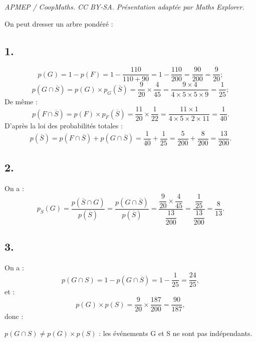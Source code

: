 \documentclass[10pt]{article}
\begin{document}
\noindent\textit{APMEP / CoopMaths. CC BY-SA. Présentation adaptée par Maths Explorer.}\par\medskip
On peut dresser un arbre pondéré :
\begin{center}
\end{center}

\subsection*{1.}

\[
p(G) = 1 - p(F) = 1 - \dfrac{110}{110 + 90} = 1 - \dfrac{110}{200} = \dfrac{90}{200} = \dfrac{9}{20};
\]
\[
p(G \cap \overline{S}) = p(G) \times p_G(\overline{S}) = \dfrac{9}{20} \times \dfrac{4}{45} = \dfrac{9 \times 4}{4 \times 5 \times 5 \times 9} = \dfrac{1}{25};
\]
De même :
\[
p(F \cap \overline{S}) = p(F) \times p_F(\overline{S}) = \dfrac{11}{20} \times \dfrac{1}{22} = \dfrac{11 \times 1}{4 \times 5 \times 2 \times 11} = \dfrac{1}{40}.
\]
D'après la loi des probabilités totales :
\[
p(\overline{S}) = p(F \cap \overline{S}) + p(G \cap \overline{S}) = \dfrac{1}{40} + \dfrac{1}{25} = \dfrac{5}{200} + \dfrac{8}{200} = \dfrac{13}{200}.
\]

\subsection*{2.}

On a :
\[
p_{\overline{S}}(G) = \dfrac{p(\overline{S} \cap G)}{p(\overline{S})} = \dfrac{p(G \cap \overline{S})}{p(\overline{S})} = \dfrac{\dfrac{9}{20} \times \dfrac{4}{45}}{\dfrac{13}{200}} = \dfrac{\dfrac{1}{25}}{\dfrac{13}{200}} = \dfrac{8}{13}.
\]

\subsection*{3.}

On a :
\[
p(G \cap S) = 1 - p(G \cap \overline{S}) = 1 - \dfrac{1}{25} = \dfrac{24}{25},
\]
et :
\[
p(G) \times p(S) = \dfrac{9}{20} \times \dfrac{187}{200} = \dfrac{90}{187},
\]
donc :

\(p(G \cap S) \neq p(G) \times p(S)\) : les événements G et S ne sont pas indépendants.
\end{document}
